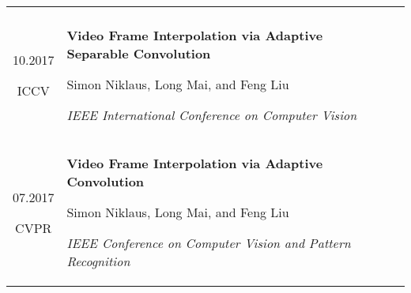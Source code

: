 \documentclass[10pt]{article}
\begin{document}
\begin{tabular}{C Z D}
{		\vspace{0.0cm}
	}
	\\
	{
		10.2017
		
		\vspace{-0.05cm}
		
		{\scriptsize ICCV}
	}
	&
	{
		{\bf Video Frame Interpolation via Adaptive Separable Convolution}
		
		\vspace{0.00cm}
		
		{\scriptsize Simon Niklaus, Long Mai, and Feng Liu}
		
		\vspace{0.05cm}
		
		{\scriptsize \it IEEE International Conference on Computer Vision}
		
		\vspace{0.0cm}
	}
	\\
	{
		07.2017
		
		\vspace{-0.05cm}
		
		{\scriptsize CVPR}
	}
	&
	{
		{\bf Video Frame Interpolation via Adaptive Convolution}
		
		\vspace{0.00cm}
		
		{\scriptsize Simon Niklaus, Long Mai, and Feng Liu}
		
		\vspace{0.05cm}
		
		{\scriptsize \it IEEE Conference on Computer Vision and Pattern Recognition}
	}
	\\
\end{tabular}
\end{document}
